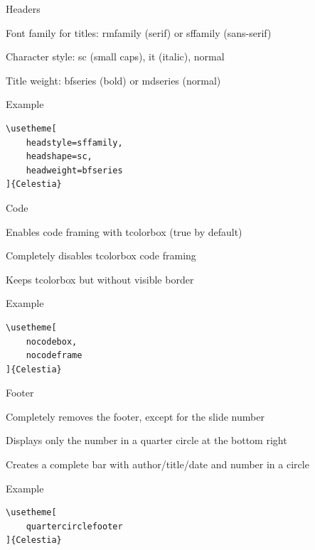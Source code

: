 \documentclass[10pt,english,aspectratio=1610,xcolor=svgnames]{beamer}
\begin{document}
\begin{frame}[fragile]{Headers}
    \begin{description}[headweight]
        \item[headstyle] Font family for titles: \alert{rmfamily} (serif) or \alert{sffamily} (sans-serif)
        \item[headshape] Character style: \alert{sc} (small caps), \alert{it} (italic), \alert{normal}
        \item[headweight] Title weight: \alert{bfseries} (bold) or \alert{mdseries} (normal)
    \end{description}

    \begin{exampleblock}{Example}
        \begin{lstlisting}[style=latex]
\usetheme[
    headstyle=sffamily,
    headshape=sc,
    headweight=bfseries
]{Celestia}
        \end{lstlisting}
    \end{exampleblock}
\end{frame}

\begin{frame}[fragile]{Code}
    \begin{description}[nocodeframe]
        \item[codebox] Enables code framing with \alert{tcolorbox} (\alert{true} by default)
        \item[nocodebox] Completely disables \alert{tcolorbox} code framing
        \item[nocodeframe] Keeps \alert{tcolorbox} but without visible border
    \end{description}

    \begin{exampleblock}{Example}
        \begin{lstlisting}[style=latex]
\usetheme[
    nocodebox,
    nocodeframe
]{Celestia}
        \end{lstlisting}
    \end{exampleblock}
\end{frame}

\begin{frame}[fragile]{Footer}
    \begin{description}[quartercirclefooter]
        \item[nofooter] Completely removes the footer, except for the slide number
        \item[quartercirclefooter] Displays only the number in a quarter circle at the bottom right
        \item[fullbarfooter] Creates a complete bar with author/title/date and number in a circle
    \end{description}

    \begin{exampleblock}{Example}
        \begin{lstlisting}[style=latex]
\usetheme[
    quartercirclefooter
]{Celestia}
        \end{lstlisting}
    \end{exampleblock}
\end{frame}
\end{document}
